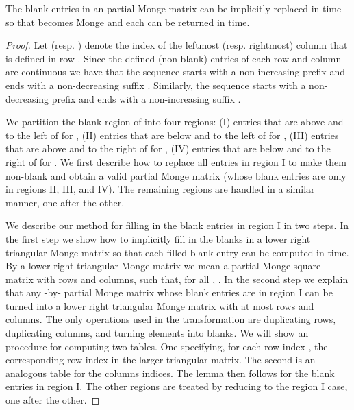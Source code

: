 \documentclass{llncs}
\begin{document}
 
\begin{lemma}\label{lemma:filltheblanks}
The blank entries in an  partial Monge matrix  can be implicitly replaced in  time so that  becomes Monge and each  can be returned in  time.
\end{lemma}
\begin{proof}
Let  (resp. ) denote the index of the leftmost (resp. rightmost) column that is defined in row . 
Since the defined (non-blank) entries of each row and column are continuous we have that the sequence  starts with a non-increasing prefix  and ends with a non-decreasing suffix . 
Similarly, the sequence  starts with a non-decreasing prefix  and ends with a non-increasing suffix . 

We partition the blank region of  into four regions: (I) entries that are above and to the left of  for , 
(II) entries that are below and to the left of  for , 
(III) entries that are above and to the right of  for , 
(IV) entries that are below and to the right of  for .
We first describe how to replace all entries in region I to make them non-blank and
obtain a valid partial Monge matrix (whose blank entries are only in regions II, III, and IV). The remaining regions are handled in a similar manner, one after the other.

We describe our method for filling in the blank entries in region I in two steps. In the first step we show how to implicitly fill in the blanks in a lower right triangular Monge matrix so that each filled blank entry can be computed in  time. By a lower right triangular Monge matrix we mean a partial Monge square matrix with  rows and columns, such that, for all , . In the second step we explain that any -by- partial Monge matrix whose blank entries are in region I can be turned into a lower right triangular Monge matrix with at most  rows and columns. The only operations used in the transformation are duplicating rows, duplicating columns, and turning elements into blanks. We will show an  procedure for computing two tables. One specifying, for each row index , the corresponding row index in the larger  triangular matrix. The second is an analogous table for the columns indices. The lemma then follows for the blank entries in region I. The other regions are treated by reducing to the region I case, one after the other.


\end{proof}
\end{document}
